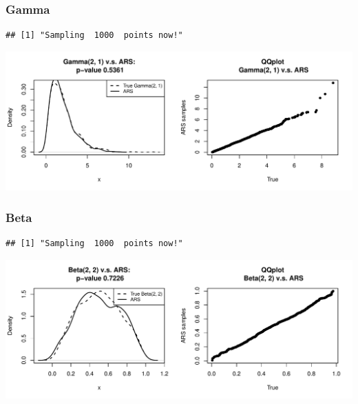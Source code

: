 \documentclass{article}\usepackage[]{graphicx}\usepackage[]{color}
\makeatletter
\def\maxwidth{ %
  \ifdim\Gin@nat@width>\linewidth
    \linewidth
  \else
    \Gin@nat@width
  \fi
}
\newenvironment{kframe}{%
 \def\at@end@of@kframe{}%
 \ifinner\ifhmode%
  \def\at@end@of@kframe{\end{minipage}}%
  \begin{minipage}{\columnwidth}%
 \fi\fi%
 \def\FrameCommand##1{\hskip\@totalleftmargin \hskip-\fboxsep
 \colorbox{shadecolor}{##1}\hskip-\fboxsep
     \hskip-\linewidth \hskip-\@totalleftmargin \hskip\columnwidth}%
 \MakeFramed {\advance\hsize-\width
   \@totalleftmargin\z@ \linewidth\hsize
   \@setminipage}}%
 {\par\unskip\endMakeFramed%
 \at@end@of@kframe}
\newenvironment{knitrout}{}{} %
\makeatother
\begin{document}
\subsubsection{Gamma}
\begin{knitrout}
\color{fgcolor}\begin{kframe}
\begin{verbatim}
## [1] "Sampling  1000  points now!"
\end{verbatim}
\end{kframe}
\includegraphics[width=\maxwidth]{figure/gamma-1} 

\end{knitrout}

\subsubsection{Beta}
\begin{knitrout}
\color{fgcolor}\begin{kframe}
\begin{verbatim}
## [1] "Sampling  1000  points now!"
\end{verbatim}
\end{kframe}
\includegraphics[width=\maxwidth]{figure/beta-1} 

\end{knitrout}
\end{document}
